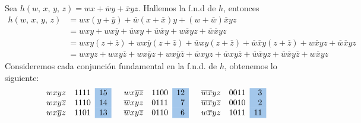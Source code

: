 \begin{myexample}
    Sea $h(w, \, x, \, y, \, z) = wx + \overline{w}y + \overline{x}yz$. Hallemos la f.n.d de $h$, entonces
    \begin{align*}
        h(w, \, x, \, y, \, z) & = wx(y + \overline{y}) + \overline{w}(x + \overline{x})y + (w + \overline{w})\overline{x}yz \\
        & = wxy + wx\overline{y} + \overline{w}xy + \overline{w} \overline{x}y + w \overline{x}yz + \overline{w}\overline{x}yz \\
        & = wxy(z + \overline{z}) + wx\overline{y}(z + \overline{z}) + \overline{w}xy(z + \overline{z}) + \overline{w} \overline{x}y(z + \overline{z}) + w \overline{x}yz + \overline{w}\overline{x}yz \\
        & = wxyz + wxy\overline{z} + wx\overline{y}z + wx\overline{y}\overline{z} + \overline{w}xyz + \overline{w}xy\overline{z} + \overline{w} \overline{x}yz + \overline{w} \overline{x}y\overline{z} + w \overline{x}yz
    \end{align*}
    Consideremos cada conjunción fundamental en la f.n.d. de $h$, obtenemos lo siguiente:
    $$\begin{array}{llr}
        wxyz & 1111 & \cellcolor{DodgerBlue3!40}{15} \\
        wxy\overline{z} & 1110 & \cellcolor{DodgerBlue3!40}{14} \\
        wx\overline{y}z & 1101 & \cellcolor{DodgerBlue3!40}{13}
    \end{array} \quad \begin{array}{llr}
        wx\overline{y}\overline{z} & 1100 & \cellcolor{DodgerBlue3!40}{12} \\
        \overline{w}xyz & 0111 & \cellcolor{DodgerBlue3!40}{7} \\
        \overline{w}xy\overline{z} & 0110 & \cellcolor{DodgerBlue3!40}{6}
    \end{array} \quad \begin{array}{llr}
        \overline{w} \overline{x}yz & 0011 & \cellcolor{DodgerBlue3!40}{3} \\
        \overline{w} \overline{x}y\overline{z} & 0010 & \cellcolor{DodgerBlue3!40}{2} \\
        w \overline{x}yz & 1011 & \cellcolor{DodgerBlue3!40}{11}

\end{array}$$
\end{myexample}
